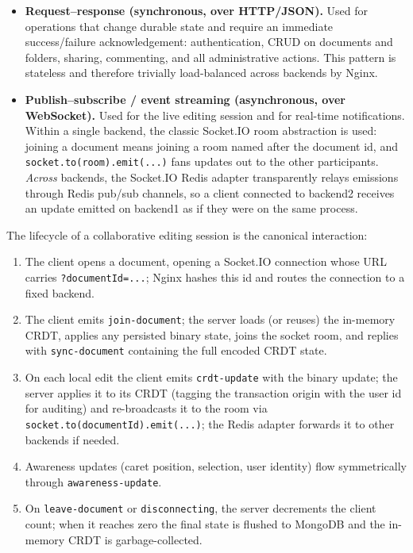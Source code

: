 \documentclass{scrartcl}
\begin{document}
  \begin{itemize}
    \item \textbf{Request--response (synchronous, over HTTP/JSON).} Used for operations that change durable state and require an immediate success/failure acknowledgement: authentication, CRUD on documents and folders, sharing, commenting, and all administrative actions. This pattern is stateless and therefore trivially load-balanced across backends by Nginx.
    \item \textbf{Publish--subscribe / event streaming (asynchronous, over WebSocket).} Used for the live editing session and for real-time notifications. Within a single backend, the classic Socket.IO room abstraction is used: joining a document means joining a room named after the document id, and \texttt{socket.to(room).emit(...)} fans updates out to the other participants. \emph{Across} backends, the Socket.IO Redis adapter transparently relays emissions through Redis pub/sub channels, so a client connected to backend2 receives an update emitted on backend1 as if they were on the same process.
  \end{itemize}

  The lifecycle of a collaborative editing session is the canonical interaction:

  \begin{enumerate}
    \item The client opens a document, opening a Socket.IO connection whose URL carries \texttt{?documentId=...}; Nginx hashes this id and routes the connection to a fixed backend.
    \item The client emits \texttt{join-document}; the server loads (or reuses) the in-memory CRDT, applies any persisted binary state, joins the socket room, and replies with \texttt{sync-document} containing the full encoded CRDT state.
    \item On each local edit the client emits \texttt{crdt-update} with the binary update; the server applies it to its CRDT (tagging the transaction origin with the user id for auditing) and re-broadcasts it to the room via \texttt{socket.to(documentId).emit(...)}; the Redis adapter forwards it to other backends if needed.
    \item Awareness updates (caret position, selection, user identity) flow symmetrically through \texttt{awareness-update}.
    \item On \texttt{leave-document} or \texttt{disconnecting}, the server decrements the client count; when it reaches zero the final state is flushed to MongoDB and the in-memory CRDT is garbage-collected.
  \end{enumerate}
\end{document}
